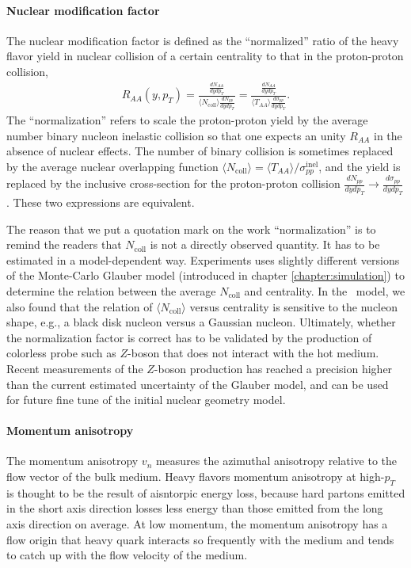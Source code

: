 \paragraph{Nuclear modification factor}
The nuclear modification factor is defined as the ``normalized'' ratio of the heavy flavor yield in nuclear collision of a certain centrality to that in the proton-proton collision,
\begin{eqnarray}
R_{AA}(y, p_T) = \frac{\frac{dN_{AA}}{dy dp_T}}{\langle N_{\textrm{coll}}\rangle \frac{dN_{pp}}{dy dp_T}} = \frac{\frac{dN_{AA}}{dy dp_T}}{\langle T_{AA} \rangle \frac{d\sigma_{pp}}{dy dp_T}} .
\end{eqnarray}
The ``normalization'' refers to scale the proton-proton yield by the average number binary nucleon inelastic collision so that one expects an unity $R_{AA}$ in the absence of nuclear effects.
The number of binary collision is sometimes replaced by the average nuclear overlapping function $\langle N_{\textrm{coll}}\rangle = \langle T_{AA} \rangle /\sigma_{pp}^{\textrm{inel}}$, and the yield is replaced by the inclusive cross-section for the proton-proton collision $\frac{dN_{pp}}{dy dp_T}\rightarrow \frac{d\sigma_{pp}}{dy dp_T}$.
These two expressions are equivalent.

The reason that we put a quotation mark on the work ``normalization'' is to remind the readers that $N_{\textrm{coll}}$ is not a directly observed quantity. 
It has to be estimated in a model-dependent way.
Experiments uses slightly different versions of the Monte-Carlo Glauber model (introduced in chapter \ref{chapter:simulation}) to determine the relation between the average $N_{\textrm{coll}}$ and centrality.
In the \trento\ model, we also found that the relation of $\langle N_{\textrm{coll}} \rangle$ versus centrality is sensitive to the nucleon shape, e.g., a black disk nucleon versus a Gaussian nucleon.
Ultimately, whether the normalization factor is correct has to be validated by the production of colorless probe such as $Z$-boson that does not interact with the hot medium.
Recent measurements of the $Z$-boson production has reached a precision higher than the current estimated uncertainty of the Glauber model, and can be used for future fine tune of the initial nuclear geometry model.

\paragraph{Momentum anisotropy}
The momentum anisotropy $v_n$ measures the azimuthal anisotropy relative to the flow vector of the bulk medium.
Heavy flavors momentum anisotropy at high-$p_T$ is thought to be the result of aisntorpic energy loss, because hard partons emitted in the short axis direction losses less energy than those emitted from the long axis direction on average.
At low momentum, the momentum anisotropy has a flow origin that heavy quark interacts so frequently with the medium and tends to catch up with the flow velocity of the medium.

